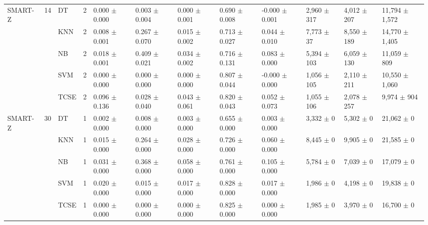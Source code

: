 \begin{table}[t]
\begin{tabular}{llllllllllll}
SMART-Z & 14 & DT & 2 & 0.000 $\pm$ 0.000 & 0.003 $\pm$ 0.004 & 0.000 $\pm$ 0.001 & 0.690 $\pm$ 0.008 & -0.000 $\pm$ 0.001 & 2,960 $\pm$ 317 & 4,012 $\pm$ 207 & 11,794 $\pm$ 1,572 \\
 &  & KNN & 2 & 0.008 $\pm$ 0.001 & 0.267 $\pm$ 0.070 & 0.015 $\pm$ 0.002 & 0.713 $\pm$ 0.027 & 0.044 $\pm$ 0.010 & 7,773 $\pm$ 37 & 8,550 $\pm$ 189 & 14,770 $\pm$ 1,405 \\
 &  & NB & 2 & 0.018 $\pm$ 0.001 & 0.409 $\pm$ 0.021 & 0.034 $\pm$ 0.002 & 0.716 $\pm$ 0.131 & 0.083 $\pm$ 0.000 & 5,394 $\pm$ 103 & 6,059 $\pm$ 130 & 11,059 $\pm$ 809 \\
 &  & SVM & 2 & 0.000 $\pm$ 0.000 & 0.000 $\pm$ 0.000 & 0.000 $\pm$ 0.000 & 0.807 $\pm$ 0.044 & -0.000 $\pm$ 0.000 & 1,056 $\pm$ 105 & 2,110 $\pm$ 211 & 10,550 $\pm$ 1,060 \\
 &  & TCSE & 2 & 0.096 $\pm$ 0.136 & 0.028 $\pm$ 0.040 & 0.043 $\pm$ 0.061 & 0.820 $\pm$ 0.043 & 0.052 $\pm$ 0.073 & 1,055 $\pm$ 106 & 2,078 $\pm$ 257 & 9,974 $\pm$ 904 \\
SMART-Z & 30 & DT & 1 & 0.002 $\pm$ 0.000 & 0.008 $\pm$ 0.000 & 0.003 $\pm$ 0.000 & 0.655 $\pm$ 0.000 & 0.003 $\pm$ 0.000 & 3,332 $\pm$ 0 & 5,302 $\pm$ 0 & 21,062 $\pm$ 0 \\
 &  & KNN & 1 & 0.015 $\pm$ 0.000 & 0.264 $\pm$ 0.000 & 0.028 $\pm$ 0.000 & 0.726 $\pm$ 0.000 & 0.060 $\pm$ 0.000 & 8,445 $\pm$ 0 & 9,905 $\pm$ 0 & 21,585 $\pm$ 0 \\
 &  & NB & 1 & 0.031 $\pm$ 0.000 & 0.368 $\pm$ 0.000 & 0.058 $\pm$ 0.000 & 0.761 $\pm$ 0.000 & 0.105 $\pm$ 0.000 & 5,784 $\pm$ 0 & 7,039 $\pm$ 0 & 17,079 $\pm$ 0 \\
 &  & SVM & 1 & 0.020 $\pm$ 0.000 & 0.015 $\pm$ 0.000 & 0.017 $\pm$ 0.000 & 0.828 $\pm$ 0.000 & 0.017 $\pm$ 0.000 & 1,986 $\pm$ 0 & 4,198 $\pm$ 0 & 19,838 $\pm$ 0 \\
 &  & TCSE & 1 & 0.000 $\pm$ 0.000 & 0.000 $\pm$ 0.000 & 0.000 $\pm$ 0.000 & 0.825 $\pm$ 0.000 & 0.000 $\pm$ 0.000 & 1,985 $\pm$ 0 & 3,970 $\pm$ 0 & 16,700 $\pm$ 0 \\
\bottomrule
\end{tabular}
\end{table}
